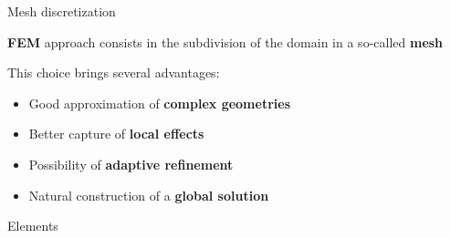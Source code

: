 \begin{frame}{Mesh discretization}
   \begin{center}
      \begin{framed}
         \textbf{FEM} approach consists in the subdivision of the domain in a so-called \textbf{\textcolor{BrickRed}{mesh}}
      \end{framed}
   \end{center}

   \pause

   This choice brings several advantages:

   \begin{itemize}
      \item Good approximation of \textbf{complex geometries}
      \item Better capture of \textbf{local effects}
      \item Possibility of \textbf{adaptive refinement}
      \item Natural construction of a \textbf{global solution}
   \end{itemize}

\end{frame}

\begin{frame}{Elements}
   
\end{frame}

